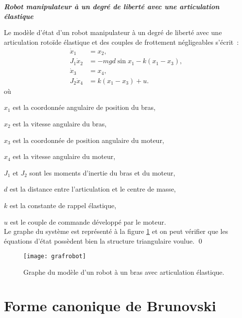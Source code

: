 \begin{exemple}{\bf \em Robot manipulateur à un degré de liberté avec une articulation élastique \label{exrobot}}

Le modèle d'état d'un robot manipulateur à un degré de liberté avec une articulation rotoïde élastique et des couples de frottement négligeables s'écrit~:
\begin{equation} \begin{split} \label{robotelast}
\dot x_1 &= x_2,  \\
J_1\dot x_2 &= -mgd\sin x_1 - k(x_1 - x_3),  \\
\dot x_3 &= x_4,  \\
J_2\dot x_4 &= k(x_1 - x_3) + u.
\end{split} \end{equation}
où

$x_1$ est la coordonnée angulaire de position du bras,

$x_2$ est la vitesse angulaire du bras,

$x_3$ est la coordonnée de position angulaire du moteur,

$x_4$ est la vitesse angulaire du moteur,

$J_1$ et $J_2$ sont les moments d'inertie du bras et du moteur,

$d$ est la distance entre l'articulation et le centre de masse,

$k$ est la constante de rappel élastique,

$u$ est le couple de commande développé par le moteur.\\

\noindent Le graphe du système est représenté à la figure 
\ref{Fig:grafrobot} et on peut vérifier que les équations d'état possèdent bien la structure triangulaire voulue. \qed
\begin{figure}[htbp]
   \centering
   \texttt{[image: grafrobot]} 
   \caption{Graphe du modèle d'un robot à un bras avec articulation élastique.}
   \label{Fig:grafrobot}
\end{figure}
\end{exemple}

\section{Forme canonique de Brunovski} \label{sectionbrunovski}

